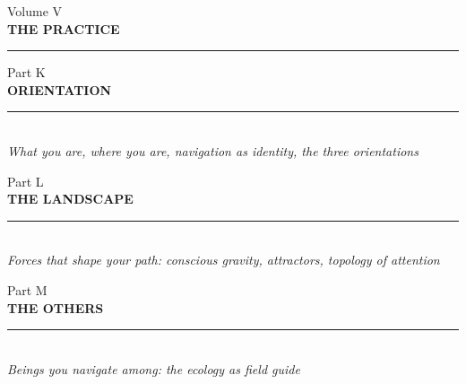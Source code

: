 \documentclass[11pt,letterpaper,openany]{book}
\begin{document}



\clearpage
\thispagestyle{empty}
\vspace*{4cm}
\begin{center}
{\large\sffamily\color{partgray}Volume V}\\[0.8cm]
{\fontsize{28}{34}\selectfont\sffamily\bfseries\color{headerblue} THE PRACTICE}\\[1cm]
{\color{rulegray}\rule{6cm}{0.4pt}}
\end{center}
\clearpage


\clearpage
\thispagestyle{empty}
\vspace*{5cm}
\begin{center}
{\large\sffamily\color{partgray}Part K}\\[0.5cm]
{\Huge\sffamily\bfseries\color{headerblue} ORIENTATION}\\[0.5cm]
{\color{rulegray}\rule{5cm}{0.3pt}}\\[1cm]
{\normalsize\itshape\color{partgray}What you are, where you are, navigation as identity, the three orientations}
\end{center}
\clearpage
{}



\clearpage
\thispagestyle{empty}
\vspace*{5cm}
\begin{center}
{\large\sffamily\color{partgray}Part L}\\[0.5cm]
{\Huge\sffamily\bfseries\color{headerblue} THE LANDSCAPE}\\[0.5cm]
{\color{rulegray}\rule{5cm}{0.3pt}}\\[1cm]
{\normalsize\itshape\color{partgray}Forces that shape your path: conscious gravity, attractors, topology of attention}
\end{center}
\clearpage
{}



\clearpage
\thispagestyle{empty}
\vspace*{5cm}
\begin{center}
{\large\sffamily\color{partgray}Part M}\\[0.5cm]
{\Huge\sffamily\bfseries\color{headerblue} THE OTHERS}\\[0.5cm]
{\color{rulegray}\rule{5cm}{0.3pt}}\\[1cm]
{\normalsize\itshape\color{partgray}Beings you navigate among: the ecology as field guide}
\end{center}
\clearpage
{}
\end{document}
